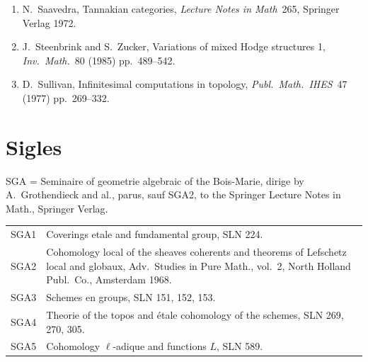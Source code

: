 \documentclass[12pt,a4paper]{article}
\theoremstyle{plain}
\theoremstyle{definition}
\theoremstyle{remark}
\begin{document}
\begin{enumerate}
\item[{[Sa]}] N.\ Saavedra, Tannakian categories, \textit{Lecture
Notes in Math}\ 265, Springer Verlag 1972.

\item[{[SZ]}] J.\ Steenbrink and S.\ Zucker, Variations of mixed Hodge
structures 1, \textit{Inv.\ Math.}\ 80 (1985) pp.\ 489--542.

\item[{[Su]}] D.\ Sullivan, Infinitesimal computations in topology,
\textit{Publ.\ Math.\ IHES}\ 47 (1977) pp.\ 269--332.
\end{enumerate}

\vspace{1cm}
\section*{Sigles}

SGA = Seminaire of geometrie algebraic of the Bois-Marie, dirige by
A.\ Grothendieck and al., parus, sauf SGA2, to the Springer Lecture Notes
in Math., Springer Verlag.

\begin{tabular}{ll}
SGA1 & Coverings etale and fundamental group, SLN 224. \\
SGA2 & Cohomology local of the sheaves coherents and theorems of
Lefschetz local and globaux, Adv.\ Studies in Pure Math., vol.\ 2,
North Holland Publ.\ Co., Amsterdam 1968. \\
SGA3 & Schemes en groups, SLN 151, 152, 153. \\
SGA4 & Theorie of the topos and étale cohomology of the schemes, SLN 269,
270, 305. \\
SGA5 & Cohomology $\ell$-adique and functions $L$, SLN 589.
\end{tabular}
\end{document}
